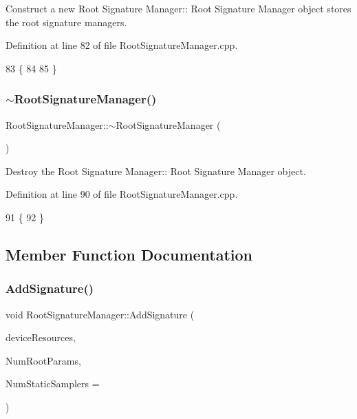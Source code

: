 Construct a new Root Signature Manager\+:\+: Root Signature Manager object stores the root signature managers. 



Definition at line 82 of file Root\+Signature\+Manager.\+cpp.


\begin{DoxyCode}
83 \{
84 
85 \}
\end{DoxyCode}
\mbox{\label{class_root_signature_manager_ac524bfff2dc4e5627ae949235f48e153}} 
\subsubsection{\texorpdfstring{$\sim$\+Root\+Signature\+Manager()}{~RootSignatureManager()}}
{\footnotesize\ttfamily Root\+Signature\+Manager\+::$\sim$\+Root\+Signature\+Manager (\begin{DoxyParamCaption}{ }\end{DoxyParamCaption})}



Destroy the Root Signature Manager\+:\+: Root Signature Manager object. 



Definition at line 90 of file Root\+Signature\+Manager.\+cpp.


\begin{DoxyCode}
91 \{
92 \}
\end{DoxyCode}


\subsection{Member Function Documentation}
\mbox{\label{class_root_signature_manager_a068bb9feb2700ec2beb8a3f900ee9f56}} 
\subsubsection{\texorpdfstring{Add\+Signature()}{AddSignature()}}
{\footnotesize\ttfamily void Root\+Signature\+Manager\+::\+Add\+Signature (\begin{DoxyParamCaption}\item[{const std\+::shared\+\_\+ptr$<$ \mbox{\hyperlink{class_d_x_1_1_device_resources}{D\+X\+::\+Device\+Resources}} $>$}]{device\+Resources,  }\item[{U\+I\+NT}]{Num\+Root\+Params,  }\item[{U\+I\+NT}]{Num\+Static\+Samplers = {} }\end{DoxyParamCaption})}



